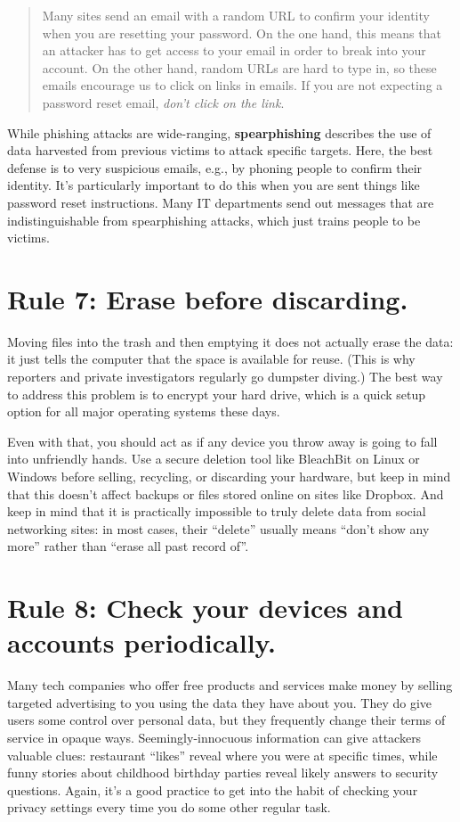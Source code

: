 \documentclass[10pt, letterpaper]{article}
\begin{document}
\begin{quote}
  Many sites send an email with a random URL to confirm your identity when you
  are resetting your password. On the one hand, this means that an attacker has
  to get access to your email in order to break into your account. On the other
  hand, random URLs are hard to type in, so these emails encourage us to click
  on links in emails. If you are not expecting a password reset
  email, \emph{don't click on the link}.
\end{quote}

While phishing attacks are wide-ranging, \textbf{spearphishing} describes the
use of data harvested from previous victims to attack specific targets. Here,
the best defense is to very suspicious emails, e.g., by phoning people to
confirm their identity. It's particularly important to do this when you are sent
things like password reset instructions. Many IT departments send out messages
that are indistinguishable from spearphishing attacks, which just trains people
to be victims.

\section*{Rule 7: Erase before discarding.}

Moving files into the trash and then emptying it does not actually erase the
data: it just tells the computer that the space is available for reuse. (This is
why reporters and private investigators regularly go dumpster diving.) The best
way to address this problem is to encrypt your hard drive, which is a quick
setup option for all major operating systems these days.

Even with that, you should act as if any device you throw away is going to fall
into unfriendly hands. Use a secure deletion tool like BleachBit on Linux or
Windows before selling, recycling, or discarding your hardware, but keep in mind
that this doesn't affect backups or files stored online on sites like
Dropbox. And keep in mind that it is practically impossible to truly delete data
from social networking sites: in most cases, their ``delete'' usually means
``don't show any more'' rather than ``erase all past record of''.

\section*{Rule 8: Check your devices and accounts periodically.}

Many tech companies who offer free products and services make money by selling
targeted advertising to you using the data they have about you.  They do give
users some control over personal data, but they frequently change their terms of
service in opaque ways. Seemingly-innocuous information can give attackers
valuable clues: restaurant ``likes'' reveal where you were at specific times,
while funny stories about childhood birthday parties reveal likely answers to
security questions. Again, it's a good practice to get into the habit of
checking your privacy settings every time you do some other regular task.
\end{document}
